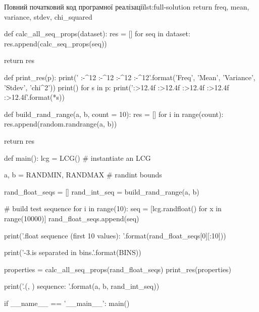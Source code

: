 \documentclass[
	a4paper,
	oneside,
	BCOR = 10mm,
	DIV = 12,
	12pt,
	headings = normal,
]{scrartcl}
\begin{document}
\begin{listingpython}[toprule = 0pt, bottomrule = 0pt]{Повний початковий код програмної реалізації}{lst:full-solution}
    return freq, mean, variance, stdev, chi_squared

def calc_all_seq_props(dataset):
    res = []
    for seq in dataset:
        res.append(calc_seq_props(seq))

    return res

def print_res(p):
    print(' {:-^12} {:-^12} {:-^12} {:-^12}'.format('Freq', 'Mean', 'Variance', 'Stdev', 'chi^2'))
    print()
    for s in p:
        print('{:>12.4f} {:>12.4f} {:>12.4f} {:>12.4f} {:>12.4f}'.format(*s))

def build_rand_range(a, b, count = 10):
    res = []
    for i in range(count):
        res.append(random.randrange(a, b))

    return res


def main():
    lcg = LCG() # instantiate an LCG

    a, b = RANDMIN, RANDMAX # randint bounds

    rand_float_seqs = []
    rand_int_seq = build_rand_range(a, b)

    # build test sequence
    for i in range(10):
        seq = [lcg.randfloat() for x in range(10000)]
        rand_float_seqs.append(seq)

    print('.\nRandom float sequence (first 10 values): {}'.format(rand_float_seqs[0][:10]))

    print('-3.\nData is separated in {} bins.'.format(BINS))

    properties = calc_all_seq_props(rand_float_seqs)
    print_res(properties)

    print('.\nRandom ({}, {}) sequence: {}'.format(a, b, rand_int_seq))


if __name__ == '__main__':
    main()
			\end{listingpython}
\end{document}

